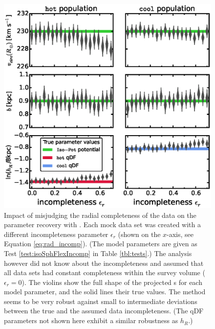 \begin{figure}[!htbp]
\centering
\includegraphics[width=\columnwidth]{figs/isoSphFlexIncompR_violins_2.eps}
\caption{Impact of misjudging the radial completeness of the data on the parameter recovery with \RM{}. Each mock data set was created with a different incompleteness parameter $\epsilon_r$ (shown on the $x$-axis, see Equation \ref{eq:rad_incomp}). (The model parameters are given as Test \ref{test:isoSphFlexIncomp} in Table \ref{tbl:tests}.) The analysis however did not know about the incompleteness and assumed that all data sets had constant completeness within the survey volume ($\epsilon_r = 0$). The violins show the full shape of the projected \pdf{}s for each model parameter, and the solid lines their true values. The \RM{} method seems to be very robust against small to intermediate deviations between the true and the assumed data incompleteness. (The qDF parameters not shown here exhibit a similar robustness as $h_R$.)} 
\label{fig:isoSphFlexIncompR_violins}
\end{figure}

